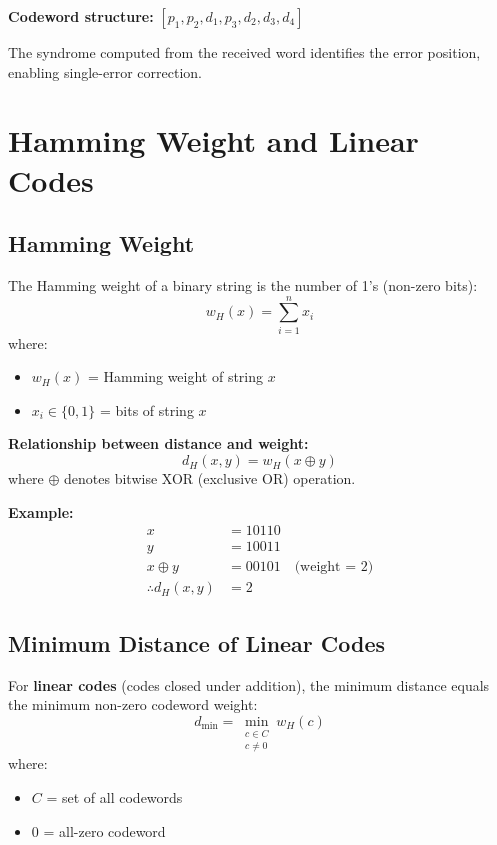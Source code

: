 \textbf{Codeword structure:} $[p_1, p_2, d_1, p_3, d_2, d_3, d_4]$

The syndrome computed from the received word identifies the error position, enabling single-error correction.

\section{Hamming Weight and Linear Codes}

\subsection{Hamming Weight}

The Hamming weight of a binary string is the number of 1's (non-zero bits):
\begin{equation}
w_H(x) = \sum_{i=1}^{n} x_i
\label{eq:hamming-weight}
\end{equation}
where:
\begin{itemize}
\item $w_H(x)$ = Hamming weight of string $x$
\item $x_i \in \{0, 1\}$ = bits of string $x$
\end{itemize}

\textbf{Relationship between distance and weight:}
\begin{equation}
d_H(x, y) = w_H(x \oplus y)
\label{eq:distance-weight}
\end{equation}
where $\oplus$ denotes bitwise XOR (exclusive OR) operation.

\textbf{Example:}
\begin{align*}
x &= 10110 \\
y &= 10011 \\
x \oplus y &= 00101 \quad \text{(weight = 2)} \\
\therefore d_H(x, y) &= 2
\end{align*}

\subsection{Minimum Distance of Linear Codes}

For \textbf{linear codes} (codes closed under addition), the minimum distance equals the minimum non-zero codeword weight:
\begin{equation}
d_{\min} = \min_{\substack{c \in C \\ c \neq 0}} w_H(c)
\label{eq:linear-min-distance}
\end{equation}
where:
\begin{itemize}
\item $C$ = set of all codewords
\item $0$ = all-zero codeword
\end{itemize}


